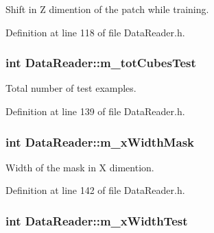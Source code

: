 Shift in Z dimention of the patch while training. 



Definition at line 118 of file Data\+Reader.\+h.

\subsubsection[{\texorpdfstring{m\+\_\+tot\+Cubes\+Test}{m_totCubesTest}}]{\setlength{\rightskip}{0pt plus 5cm}int Data\+Reader\+::m\+\_\+tot\+Cubes\+Test\hspace{0.3cm}{\ttfamily [private]}}\hypertarget{classDataReader_a1a13928367a9c5d02f6e11d2d742e429}{}\label{classDataReader_a1a13928367a9c5d02f6e11d2d742e429}


Total number of test examples. 



Definition at line 139 of file Data\+Reader.\+h.

\subsubsection[{\texorpdfstring{m\+\_\+x\+Width\+Mask}{m_xWidthMask}}]{\setlength{\rightskip}{0pt plus 5cm}int Data\+Reader\+::m\+\_\+x\+Width\+Mask\hspace{0.3cm}{\ttfamily [private]}}\hypertarget{classDataReader_af20e42b5dc09a33b2c2704cb58d01803}{}\label{classDataReader_af20e42b5dc09a33b2c2704cb58d01803}


Width of the mask in X dimention. 



Definition at line 142 of file Data\+Reader.\+h.

\subsubsection[{\texorpdfstring{m\+\_\+x\+Width\+Test}{m_xWidthTest}}]{\setlength{\rightskip}{0pt plus 5cm}int Data\+Reader\+::m\+\_\+x\+Width\+Test\hspace{0.3cm}{\ttfamily [private]}}\hypertarget{classDataReader_a3b70edeb59564609bc13d11761586225}{}\label{classDataReader_a3b70edeb59564609bc13d11761586225}


